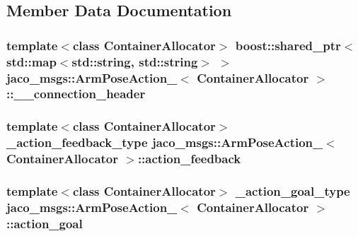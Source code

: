 \subsection{Member Data Documentation}
\subsubsection[{\texorpdfstring{\+\_\+\+\_\+connection\+\_\+header}{__connection_header}}]{\setlength{\rightskip}{0pt plus 5cm}template$<$class Container\+Allocator$>$ boost\+::shared\+\_\+ptr$<$std\+::map$<$std\+::string, std\+::string$>$ $>$ {\bf jaco\+\_\+msgs\+::\+Arm\+Pose\+Action\+\_\+}$<$ Container\+Allocator $>$\+::\+\_\+\+\_\+connection\+\_\+header}\hypertarget{structjaco__msgs_1_1ArmPoseAction___acfc017cafdd61ac6456935973d7a0ce4}{}\label{structjaco__msgs_1_1ArmPoseAction___acfc017cafdd61ac6456935973d7a0ce4}
\subsubsection[{\texorpdfstring{action\+\_\+feedback}{action_feedback}}]{\setlength{\rightskip}{0pt plus 5cm}template$<$class Container\+Allocator$>$ {\bf \+\_\+action\+\_\+feedback\+\_\+type} {\bf jaco\+\_\+msgs\+::\+Arm\+Pose\+Action\+\_\+}$<$ Container\+Allocator $>$\+::action\+\_\+feedback}\hypertarget{structjaco__msgs_1_1ArmPoseAction___a695dce59093487f6fc2cf2e6f56054b1}{}\label{structjaco__msgs_1_1ArmPoseAction___a695dce59093487f6fc2cf2e6f56054b1}
\subsubsection[{\texorpdfstring{action\+\_\+goal}{action_goal}}]{\setlength{\rightskip}{0pt plus 5cm}template$<$class Container\+Allocator$>$ {\bf \+\_\+action\+\_\+goal\+\_\+type} {\bf jaco\+\_\+msgs\+::\+Arm\+Pose\+Action\+\_\+}$<$ Container\+Allocator $>$\+::action\+\_\+goal}\hypertarget{structjaco__msgs_1_1ArmPoseAction___a6347014c556c9d16ce23aeda73381e66}{}\label{structjaco__msgs_1_1ArmPoseAction___a6347014c556c9d16ce23aeda73381e66}
